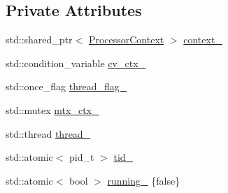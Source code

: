 \subsection*{Private Attributes}
\begin{DoxyCompactItemize}
\item 
std\-::shared\-\_\-ptr$<$ \hyperlink{classapollo_1_1cyber_1_1scheduler_1_1ProcessorContext}{Processor\-Context} $>$ \hyperlink{classapollo_1_1cyber_1_1scheduler_1_1Processor_aeec2ffd44e4449e5a14f62bc4ce90473}{context\-\_\-}
\item 
std\-::condition\-\_\-variable \hyperlink{classapollo_1_1cyber_1_1scheduler_1_1Processor_a7cb6c27d4d7922832e3a357438f129e6}{cv\-\_\-ctx\-\_\-}
\item 
std\-::once\-\_\-flag \hyperlink{classapollo_1_1cyber_1_1scheduler_1_1Processor_af8d792d6a520ca8a91e82e14026d1f62}{thread\-\_\-flag\-\_\-}
\item 
std\-::mutex \hyperlink{classapollo_1_1cyber_1_1scheduler_1_1Processor_aa2f22c012a66da1ada177e5839a0c8b9}{mtx\-\_\-ctx\-\_\-}
\item 
std\-::thread \hyperlink{classapollo_1_1cyber_1_1scheduler_1_1Processor_a2a0aaa17f63537e1cf23676b2645fbf3}{thread\-\_\-}
\item 
std\-::atomic$<$ pid\-\_\-t $>$ \hyperlink{classapollo_1_1cyber_1_1scheduler_1_1Processor_a6cdc919faf4daee51d13c77f07b79194}{tid\-\_\-}
\item 
std\-::atomic$<$ bool $>$ \hyperlink{classapollo_1_1cyber_1_1scheduler_1_1Processor_a7d77fcdd037bb308488b6f2bdb135101}{running\-\_\-} \{false\}
\end{DoxyCompactItemize}


